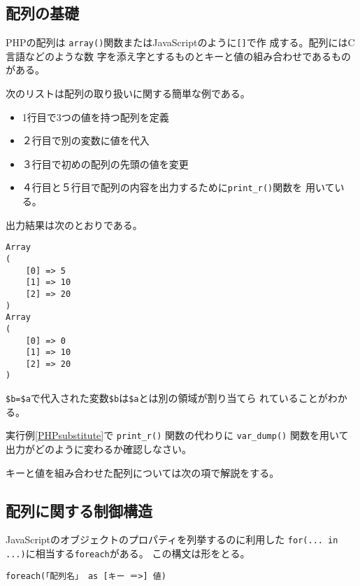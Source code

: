 \subsection{配列の基礎}
PHPの配列は \texttt{array()}関数またはJavaScriptのように\texttt{[]}で作
成する。配列にはC言語などのような数
字を添え字とするものとキーと値の組み合わせであるものがある。
\begin{Exec}
 \upshape
 次のリストは配列の取り扱いに関する簡単な例である。
\begin{itemize}
 \item 1行目で3つの値を持つ配列を定義
 \item ２行目で別の変数に値を代入
 \item ３行目で初めの配列の先頭の値を変更
 \item ４行目と５行目で配列の内容を出力するために\Verb+print_r()+関数を
			 用いている。
\end{itemize}
出力結果は次のとおりである。
\begin{Verbatim}[fontsize=\footnotesize]
Array
(
    [0] => 5
    [1] => 10
    [2] => 20
)
Array
(
    [0] => 0
    [1] => 10
    [2] => 20
)
\end{Verbatim}
\Verb+$b=$a+で代入された変数\Verb+$b+は\Verb+$a+とは別の領域が割り当てら
れていることがわかる。
\end{Exec}
 \begin{Prob}\upshape
  実行例\ref{PHPsubstitute}で \Verb+print_r()+ 関数の代わりに
   \Verb+var_dump()+ 関数を用いて出力がどのように変わるか確認しなさい。
 \end{Prob}
キーと値を組み合わせた配列については次の項で解説をする。
\subsection{配列に関する制御構造}
JavaScriptのオブジェクトのプロパティを列挙するのに利用した
\texttt{for(... in ...)}に相当する\texttt{foreach}がある。
この構文は形をとる。

\texttt{foreach(「配列名」 as [キー ＝>] 値)}

